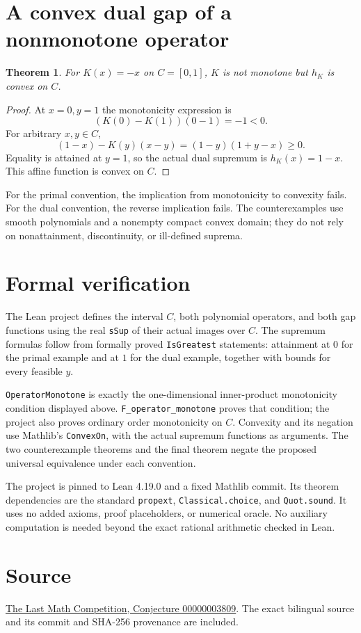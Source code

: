 \documentclass[11pt]{article}
\newtheorem{theorem}{Theorem}
\begin{document}
\section*{A convex dual gap of a nonmonotone operator}
\begin{theorem}
For $K(x)=-x$ on $C=[0,1]$, $K$ is not monotone but $h_K$ is convex on $C$.
\end{theorem}
\begin{proof}
At $x=0,y=1$ the monotonicity expression is
\[
 (K(0)-K(1))(0-1)=-1<0.
\]
For arbitrary $x,y\in C$,
\[
 (1-x)-K(y)(x-y)=(1-y)(1+y-x)\geq0.
\]
Equality is attained at $y=1$, so the actual dual supremum is $h_K(x)=1-x$. This affine function is convex on $C$.
\end{proof}

For the primal convention, the implication from monotonicity to convexity fails. For the dual convention, the reverse implication fails. The counterexamples use smooth polynomials and a nonempty compact convex domain; they do not rely on nonattainment, discontinuity, or ill-defined suprema.

\section*{Formal verification}
The Lean project defines the interval $C$, both polynomial operators, and both gap functions using the real \texttt{sSup} of their actual images over $C$. The supremum formulas follow from formally proved \texttt{IsGreatest} statements: attainment at $0$ for the primal example and at $1$ for the dual example, together with bounds for every feasible $y$.

\texttt{OperatorMonotone} is exactly the one-dimensional inner-product monotonicity condition displayed above. \texttt{F\_operator\_monotone} proves that condition; the project also proves ordinary order monotonicity on $C$. Convexity and its negation use Mathlib's \texttt{ConvexOn}, with the actual supremum functions as arguments. The two counterexample theorems and the final theorem negate the proposed universal equivalence under each convention.

The project is pinned to Lean 4.19.0 and a fixed Mathlib commit. Its theorem dependencies are the standard \texttt{propext}, \texttt{Classical.choice}, and \texttt{Quot.sound}. It uses no added axioms, proof placeholders, or numerical oracle. No auxiliary computation is needed beyond the exact rational arithmetic checked in Lean.

\section*{Source}
\href{https://github.com/The-Last-Math-Competition/The-Last-Math-Competition/blob/main/conjectures/00000003809.md}{The Last Math Competition, Conjecture 00000003809}. The exact bilingual source and its commit and SHA-256 provenance are included.
\end{document}
